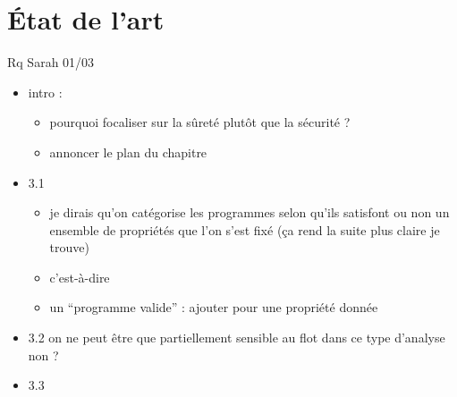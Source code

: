 \section{État de l'art}%

Rq Sarah 01/03

\begin{itemize}
\item
  intro :

  \begin{itemize}
  \item
    pourquoi focaliser sur la sûreté plutôt que la sécurité ?
  \item
    annoncer le plan du chapitre
  \end{itemize}
\item
  3.1

  \begin{itemize}
  \item
    je dirais qu'on catégorise les programmes selon qu'ils satisfont ou
    non un ensemble de propriétés que l'on s'est fixé (ça rend la suite
    plus claire je trouve)
  \item
    c'est-à-dire
  \item
    un ``programme valide'' : ajouter pour une propriété donnée
  \end{itemize}
\item
  3.2 on ne peut être que partiellement sensible au flot dans ce type
  d'analyse non ?
\item
  3.3


\end{itemize}
